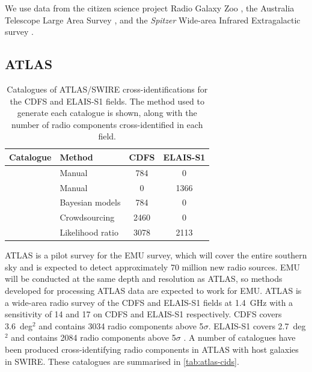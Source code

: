 \documentclass[fleqn,usenatbib,usedcolumn]{mnras}
\newcommand{\jansky}{\text{Jy}}
\begin{document}
  We use data from the citizen science project Radio Galaxy Zoo
  \citep{banfield15}, the Australia Telescope Large Area Survey
  \citep[ATLAS;][]{norris06,franzen15}, and the \emph{Spitzer} Wide-area Infrared
  Extragalactic survey \citep[SWIRE;][]{lonsdale03swire, surace05swire}.

  \subsection{ATLAS}\label{sec:atlas}
    \begin{table}
      \caption{Catalogues of ATLAS/SWIRE cross-identifications for the CDFS
        and ELAIS-S1 fields. The method used to generate each catalogue is
        shown, along with the number of radio components cross-identified in each
        field.}
      \label{tab:atlas-cids}
      \begin{tabular}{llcc}
        \hline
        Catalogue & Method & CDFS & ELAIS-S1\\
        \hline
        \citet{norris06} & Manual & 784 & 0\\
        \citet{middelberg08} & Manual & 0 & 1366\\
        \citet{fan15} & Bayesian models & 784 & 0\\
        \citet{wong17} & Crowdsourcing & 2460 & 0 \\
        \citet{weston17} & Likelihood ratio & 3078 & 2113\\
        \hline
      \end{tabular}
    \end{table}

    ATLAS is a pilot survey for the EMU \citep{norris11} survey, which will
    cover the entire southern sky and is expected to detect approximately 70
    million new radio sources. EMU will be conducted at the same depth and
    resolution as ATLAS, so methods developed for processing ATLAS data are
    expected to work for EMU. ATLAS is a wide-area radio survey of the CDFS
    and ELAIS-S1 fields at 1.4~GHz with a sensitivity of
    14 and \unit{17}{\micro\jansky} on CDFS and ELAIS-S1 respectively.
    CDFS covers 3.6~deg$^2$ and contains 3034 radio components above
    5$\sigma$. ELAIS-S1 covers 2.7~deg$^2$ and contains 2084 radio components
    above 5$\sigma$ \citep{franzen15}. A number of catalogues have been
    produced cross-identifying radio components in ATLAS with host galaxies in
    SWIRE. These catalogues are summarised in \autoref{tab:atlas-cids}.
\end{document}
